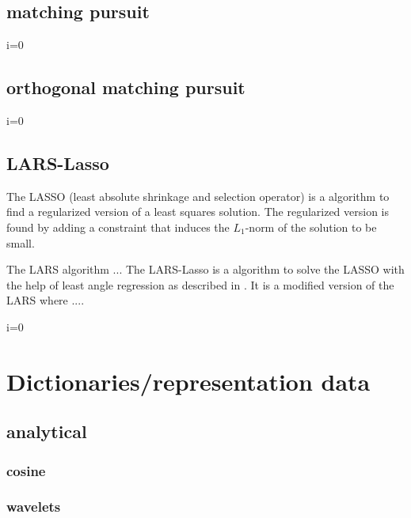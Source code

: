 \subsection{matching pursuit}
\begin{algorithm}
\begin{algorithmic}
\STATE i=0
\end{algorithmic}
\end{algorithm}

\subsection{orthogonal matching pursuit}
\label{sec:omp}
\begin{algorithm}
\begin{algorithmic}
\STATE i=0
\end{algorithmic}
\end{algorithm}

\subsection{LARS-Lasso}
The LASSO (least absolute shrinkage and selection operator) is a algorithm to find a regularized version of a least squares solution.
The regularized version is found by adding a constraint that induces the $L_1$-norm of the solution to be small.

The LARS algorithm ... \cite{LARS}
The LARS-Lasso is a algorithm to solve the LASSO with the help of least angle regression
as described in \cite{LARS}. It is a modified version of the LARS where ....

\begin{algorithm}
\begin{algorithmic}
\STATE i=0
\end{algorithmic}
\end{algorithm}


\section{Dictionaries/representation data}
\subsection{analytical}
\subsubsection{cosine}
\subsubsection{wavelets}

